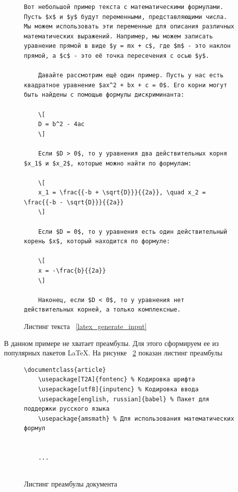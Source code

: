 \begin{figure}
    \begin{lstlisting}[language={[LaTeX]Tex}]
    Вот небольшой пример текста с математическими формулами. Пусть $x$ и $y$ будут переменными, представляющими числа. Мы можем использовать эти переменные для описания различных математических выражений. Например, мы можем записать уравнение прямой в виде $y = mx + c$, где $m$ - это наклон прямой, а $c$ - это её точка пересечения с осью $y$.
            
    Давайте рассмотрим ещё один пример. Пусть у нас есть квадратное уравнение $ax^2 + bx + c = 0$. Его корни могут быть найдены с помощью формулы дискриминанта:
        
    \[
    D = b^2 - 4ac
    \]
        
    Если $D > 0$, то у уравнения два действительных корня $x_1$ и $x_2$, которые можно найти по формулам:
        
    \[
    x_1 = \frac{{-b + \sqrt{D}}}{{2a}}, \quad x_2 = \frac{{-b - \sqrt{D}}}{{2a}}
    \]
        
    Если $D = 0$, то у уравнения есть один действительный корень $x$, который находится по формуле:
        
    \[
    x = -\frac{b}{{2a}}
    \]
        
    Наконец, если $D < 0$, то у уравнения нет действительных корней, а только комплексные.
    \end{lstlisting}
    \caption{Листинг текста ~\ref{latex_generate_input}}
    \label{latex_code}
\end{figure}

В данном примере не хватает преамбулы. Для этого сформируем ее из популярных пакетов \LaTeX. На рисунке ~\ref{preambula} показан листинг преамбулы

\begin{figure}
    \begin{lstlisting}[language={[LaTeX]Tex}]
    \documentclass{article}
    \usepackage[T2A]{fontenc} % Кодировка шрифта
    \usepackage[utf8]{inputenc} % Кодировка ввода
    \usepackage[english, russian]{babel} % Пакет для поддержки русского языка
    \usepackage{amsmath} % Для использования математических формул
    
    
    ...
    
    \end{lstlisting}
    \caption{Листинг преамбулы документа}
    \label{preambula}
\end{figure}